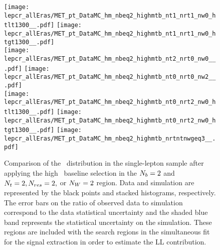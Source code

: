 \begin{figure}[!h]
	\begin{center}
  \texttt{[image: lepcr\_allEras/MET\_pt\_DataMC\_hm\_nbeq2\_highmtb\_nt1\_nrt1\_nw0\_htlt1300\_\_.pdf]}
  \texttt{[image: lepcr\_allEras/MET\_pt\_DataMC\_hm\_nbeq2\_highmtb\_nt1\_nrt1\_nw0\_htgt1300\_\_.pdf]} \\
  \texttt{[image: lepcr\_allEras/MET\_pt\_DataMC\_hm\_nbeq2\_highmtb\_nt2\_nrt0\_nw0\_\_.pdf]}
  \texttt{[image: lepcr\_allEras/MET\_pt\_DataMC\_hm\_nbeq2\_highmtb\_nt0\_nrt0\_nw2\_\_.pdf]} \\
  \texttt{[image: lepcr\_allEras/MET\_pt\_DataMC\_hm\_nbeq2\_highmtb\_nt0\_nrt2\_nw0\_htlt1300\_\_.pdf]}  
  \texttt{[image: lepcr\_allEras/MET\_pt\_DataMC\_hm\_nbeq2\_highmtb\_nt0\_nrt2\_nw0\_htgt1300\_\_.pdf]} 
  \texttt{[image: lepcr\_allEras/MET\_pt\_DataMC\_hm\_nbeq2\_highmtb\_nrtntnwgeq3\_\_.pdf]} \\
	\end{center}
	\caption[Lost Lepton HM Control Region $\nb=2$ with 2 heavy objects]{Comparison of the \met~distribution in the single-lepton sample after applying the high \dm~baseline selection in the $\nb=2$ and $N_{t}=2, N_{res}=2,$ or $N_{W}=2$ region. Data and simulation are represented by the black points and stacked histograms, respectively. The error bars on the ratio of observed data to simulation correspond to the data statistical uncertainty and the shaded blue band represents the statistical uncertainty on the simulation. These regions are included with the search regions in the simultaneous fit for the signal extraction in order to estimate the LL contribution.
	 }
	\label{fig:llb-1lcr-datavsmc-hm-nb2-2}
\end{figure}


